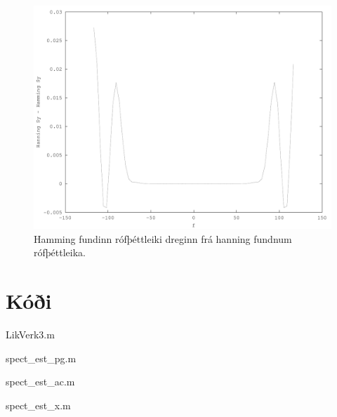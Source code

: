 \documentclass[11pt,a4paper]{article}
\begin{document}
\begin{figure}[htbp]
    \begin{center}
        \includegraphics[scale=0.5]{fig7.pdf}
    \end{center}
    \caption{Hamming fundinn rófþéttleiki dreginn frá hanning fundnum rófþéttleika.}
    \label{fig:vs}
\end{figure}
\clearpage
\section{Kóði} \label{se:kodi}
LikVerk3.m

spect\_est\_pg.m


spect\_est\_ac.m


spect\_est\_x.m

\end{document}
